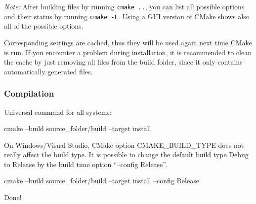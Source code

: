 \textit{Note:} After building files by running \texttt{cmake ..}, you can list all possible options and their status by running \texttt{cmake -L}. 
Using a GUI version of CMake shows also all of the possible options.   

Corresponding settings are cached, thus they will be used again next time CMake is run.
If you encounter a problem during installation, it is recommended to clean the cache by just removing all files from the build folder, since it only contains automatically generated files. 


\subsubsection{Compilation}
Universal command for all systems:
\begin{listing}[mybash]
cmake --build {source_folder}/build --target install
\end{listing}

On Windows/Visual Studio, CMake option CMAKE\_BUILD\_TYPE does not really affect the build type. It is possible to change the default build type Debug to Release by the build time option ``--config Release''.
\begin{listing}[mybash]
cmake --build {source_folder}/build --target install --config Release
\end{listing}

Done!
